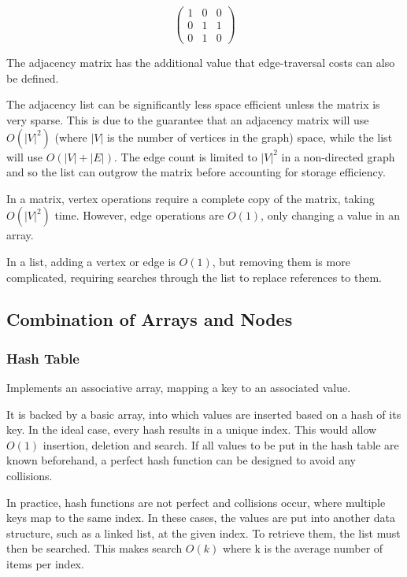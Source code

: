 \documentclass[]{article}
\begin{document}
\[ \left( \begin{array}{ccc}
1 & 0 & 0 \\
0 & 1 & 1 \\
0 & 1 & 0 \end{array} \right)\] 

The adjacency matrix has the additional value that edge-traversal costs can also be defined.

The adjacency list can be significantly less space efficient unless the matrix is very sparse. This is due to the guarantee that an adjacency matrix will use $O(|V|^{2})$ (where $|V|$ is the number of vertices in the graph) space, while the list will use $O(|V| + |E|)$. The edge count is limited to $|V|^{2}$ in a non-directed graph and so the list can outgrow the matrix before accounting for storage efficiency.

In a matrix, vertex operations require a complete copy of the matrix, taking $O(|V|^{2})$ time. However, edge operations are $O(1)$, only changing a value in an array.

In a list, adding a vertex or edge is $O(1)$, but removing them is more complicated, requiring searches through the list to replace references to them.

\pagebreak

\subsection{Combination of Arrays and Nodes}

\subsubsection{Hash Table}

Implements an associative array, mapping a key to an associated value.

It is backed by a basic array, into which values are inserted based on a hash of its key. In the ideal case, every hash results in a unique index. This would allow $O(1)$ insertion, deletion and search. If all values to be put in the hash table are known beforehand, a perfect hash function can be designed to avoid any collisions.

In practice, hash functions are not perfect and collisions occur, where multiple keys map to the same index. In these cases, the values are put into another data structure, such as a linked list, at the given index. To retrieve them, the list must then be searched. This makes search $O(k)$ where k is the average number of items per index.
\end{document}
